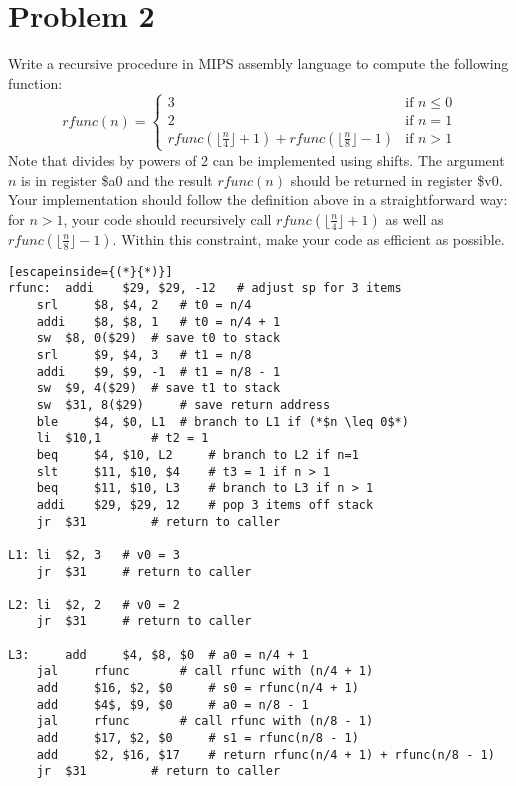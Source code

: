 \documentclass[10pt,letterpaper]{article}
\begin{document}

\section{Problem 2}
Write a recursive procedure in MIPS assembly language to compute the following function:
\[rfunc(n)=
\begin{cases}
3 & \text{if }n\leq0 \\
2 & \text{if }n=1 \\
rfunc(\lfloor \frac{n}{4} \rfloor + 1) + rfunc(\lfloor \frac{n}{8} \rfloor - 1) & \text{if }n>1 
\end{cases}\]
Note that divides by powers of 2 can be implemented using shifts. The argument $n$ is in register \$a0 and the result $rfunc(n)$ should be returned in register \$v0. Your implementation should follow the definition above in a straightforward way: for $n>1$, your code should recursively call $rfunc(\lfloor \frac{n}{4} \rfloor + 1)$ as well as $rfunc(\lfloor \frac{n}{8} \rfloor - 1)$. Within this constraint, make your code as efficient as possible.
\begin{lstlisting}[escapeinside={(*}{*)}]
rfunc: 	addi 	$29, $29, -12 	# adjust sp for 3 items
	srl 	$8, $4, 2 	# t0 = n/4
	addi 	$8, $8, 1 	# t0 = n/4 + 1
	sw 	$8, 0($29) 	# save t0 to stack
	srl 	$9, $4, 3 	# t1 = n/8
	addi 	$9, $9, -1 	# t1 = n/8 - 1
	sw 	$9, 4($29) 	# save t1 to stack
	sw 	$31, 8($29) 	# save return address
	ble 	$4, $0, L1 	# branch to L1 if (*$n \leq 0$*)
	li 	$10,1 		# t2 = 1
	beq 	$4, $10, L2 	# branch to L2 if n=1
	slt 	$11, $10, $4 	# t3 = 1 if n > 1
	beq 	$11, $10, L3 	# branch to L3 if n > 1
	addi 	$29, $29, 12 	# pop 3 items off stack
	jr 	$31 		# return to caller

L1:	li 	$2, 3	# v0 = 3
	jr 	$31 	# return to caller

L2:	li 	$2, 2 	# v0 = 2
	jr 	$31 	# return to caller

L3: 	add 	$4, $8, $0 	# a0 = n/4 + 1
	jal 	rfunc 		# call rfunc with (n/4 + 1)
	add 	$16, $2, $0 	# s0 = rfunc(n/4 + 1)
	add 	$4$, $9, $0 	# a0 = n/8 - 1
	jal 	rfunc 		# call rfunc with (n/8 - 1)
	add 	$17, $2, $0  	# s1 = rfunc(n/8 - 1)
	add 	$2, $16, $17 	# return rfunc(n/4 + 1) + rfunc(n/8 - 1)
	jr 	$31 		# return to caller
\end{lstlisting}
\pagebreak

\end{document}
